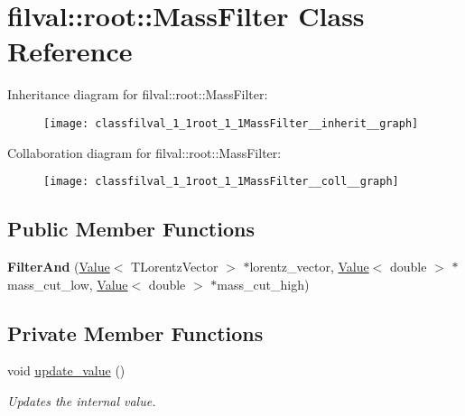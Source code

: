 \hypertarget{classfilval_1_1root_1_1MassFilter}{}\section{filval\+:\+:root\+:\+:Mass\+Filter Class Reference}
\label{classfilval_1_1root_1_1MassFilter}


Inheritance diagram for filval\+:\+:root\+:\+:Mass\+Filter\+:
\nopagebreak
\begin{figure}[H]
\begin{center}
\leavevmode
\texttt{[image: classfilval\_1\_1root\_1\_1MassFilter\_\_inherit\_\_graph]}
\end{center}
\end{figure}


Collaboration diagram for filval\+:\+:root\+:\+:Mass\+Filter\+:
\nopagebreak
\begin{figure}[H]
\begin{center}
\leavevmode
\texttt{[image: classfilval\_1\_1root\_1\_1MassFilter\_\_coll\_\_graph]}
\end{center}
\end{figure}
\subsection*{Public Member Functions}
\begin{DoxyCompactItemize}
\item 
\hypertarget{classfilval_1_1root_1_1MassFilter_a24b371e910e0b920e19ec3c55ed75e94}{}\label{classfilval_1_1root_1_1MassFilter_a24b371e910e0b920e19ec3c55ed75e94} 
{\bfseries Filter\+And} (\hyperlink{classfilval_1_1Value}{Value}$<$ T\+Lorentz\+Vector $>$ $\ast$lorentz\+\_\+vector, \hyperlink{classfilval_1_1Value}{Value}$<$ double $>$ $\ast$mass\+\_\+cut\+\_\+low, \hyperlink{classfilval_1_1Value}{Value}$<$ double $>$ $\ast$mass\+\_\+cut\+\_\+high)
\end{DoxyCompactItemize}
\subsection*{Private Member Functions}
\begin{DoxyCompactItemize}
\item 
void \hyperlink{classfilval_1_1root_1_1MassFilter_a7858ca9aab96796fdb071b9ed55c5745}{update\+\_\+value} ()
\begin{DoxyCompactList}\small\item\em Updates the internal value. \end{DoxyCompactList}\end{DoxyCompactItemize}
